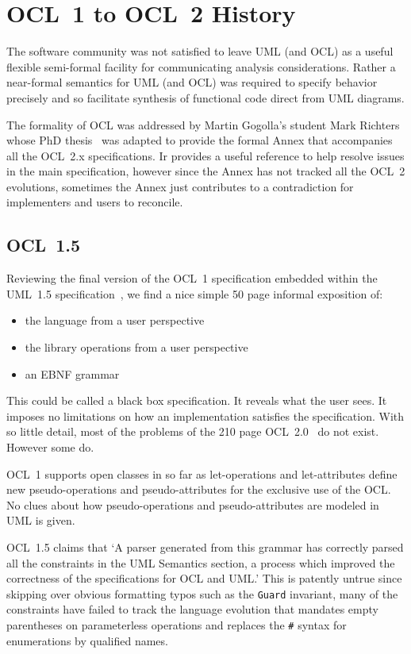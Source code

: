 \documentclass{jot}
\begin{document}
\section{OCL~1 to OCL~2 History}\label{History}

The software community was not satisfied to leave UML (and OCL) as a useful flexible semi-formal facility for communicating analysis considerations. Rather a near-formal semantics for UML (and OCL) was required to specify behavior precisely and so facilitate synthesis of functional code direct from UML diagrams. 

The formality of OCL was addressed by Martin Gogolla's student Mark Richters whose PhD thesis~\cite{Richters} was adapted to provide the formal Annex that accompanies all the OCL~2.x specifications. Ir provides a useful reference to help resolve issues in the main specification, however since the Annex has not tracked all the OCL~2 evolutions, sometimes the Annex just contributes to a contradiction for implementers and users to reconcile.

\subsection{OCL~1.5}

Reviewing the final version of the OCL~1 specification embedded within the UML~1.5 specification~\cite{UML-1.5}, we find a nice simple 50 page informal exposition of:
\begin{itemize}
	\item{the language from a user perspective}
	\item{the library operations from a user perspective}
	\item{an EBNF grammar}
\end{itemize}

This could be called a black box specification. It reveals what the user sees. It imposes no limitations on how an implementation satisfies the specification. With so little detail, most of the problems of the 210 page OCL~2.0~\cite{OCL-2.0} do not exist. However some do.

OCL~1 supports open classes in so far as let-operations and let-attributes define new pseudo-operations and pseudo-attributes for the exclusive use of the OCL. No clues about how pseudo-operations and pseudo-attributes are modeled in UML is given.

OCL~1.5 claims that `A parser generated from this grammar has correctly parsed all the constraints in the UML Semantics section, a process which improved the correctness of the specifications for OCL and UML.' This is patently untrue since skipping over obvious formatting typos such as the \verb$Guard$ invariant, many of the constraints have failed to track the language evolution that mandates empty parentheses on parameterless operations and replaces the \verb$#$ syntax for enumerations by qualified names.
\end{document}
